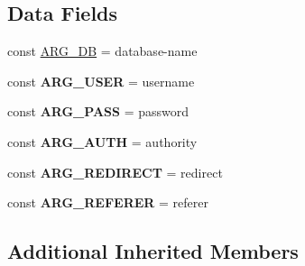 \subsection*{Data Fields}
\begin{DoxyCompactItemize}
\item 
const \hyperlink{interface_able_polecat___transaction___restricted_interface_a10cda78d935c26575ec9618b61e0aef5}{A\+R\+G\+\_\+\+D\+B} = \textquotesingle{}database-\/name\textquotesingle{}
\item 
\hypertarget{interface_able_polecat___transaction___restricted_interface_a68709a24f07c4499d0b3c69fdf6ca49a}{}const {\bfseries A\+R\+G\+\_\+\+U\+S\+E\+R} = \textquotesingle{}username\textquotesingle{}\label{interface_able_polecat___transaction___restricted_interface_a68709a24f07c4499d0b3c69fdf6ca49a}

\item 
\hypertarget{interface_able_polecat___transaction___restricted_interface_aac3ce5e700654db39c288cc77761c0fb}{}const {\bfseries A\+R\+G\+\_\+\+P\+A\+S\+S} = \textquotesingle{}password\textquotesingle{}\label{interface_able_polecat___transaction___restricted_interface_aac3ce5e700654db39c288cc77761c0fb}

\item 
\hypertarget{interface_able_polecat___transaction___restricted_interface_ab5e90ee7dc8b523ff0ada5a8b1967259}{}const {\bfseries A\+R\+G\+\_\+\+A\+U\+T\+H} = \textquotesingle{}authority\textquotesingle{}\label{interface_able_polecat___transaction___restricted_interface_ab5e90ee7dc8b523ff0ada5a8b1967259}

\item 
\hypertarget{interface_able_polecat___transaction___restricted_interface_a561a47ca3cb15b4b1dda786946fc6a85}{}const {\bfseries A\+R\+G\+\_\+\+R\+E\+D\+I\+R\+E\+C\+T} = \textquotesingle{}redirect\textquotesingle{}\label{interface_able_polecat___transaction___restricted_interface_a561a47ca3cb15b4b1dda786946fc6a85}

\item 
\hypertarget{interface_able_polecat___transaction___restricted_interface_ae8eefbfd7de3a36e75017091494d3ed1}{}const {\bfseries A\+R\+G\+\_\+\+R\+E\+F\+E\+R\+E\+R} = \textquotesingle{}referer\textquotesingle{}\label{interface_able_polecat___transaction___restricted_interface_ae8eefbfd7de3a36e75017091494d3ed1}

\end{DoxyCompactItemize}
\subsection*{Additional Inherited Members}


